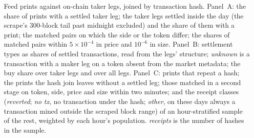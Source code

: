 \begin{table}[htbp]
\caption{Feed prints against on-chain taker legs, joined by transaction hash. Panel~A: the share of prints with a settled taker leg; the taker legs settled inside the day (the scrape's 300-block tail past midnight excluded) and the share of them with a print; the matched pairs on which the side or the token differ; the shares of matched pairs within $5\times10^{-4}$ in price and $10^{-6}$ in size. Panel~B: settlement types as shares of settled transactions, read from the legs' structure; \emph{unknown} is a transaction with a maker leg on a token absent from the market metadata; the buy share over taker legs and over all legs. Panel~C: prints that repeat a hash; the prints the hash join leaves without a settled leg; those matched in a second stage on token, side, price and size within two minutes; and the receipt classes (\emph{reverted}; \emph{no tx}, no transaction under the hash; \emph{other}, on these days always a transaction mined outside the scraped block range) of an hour-stratified sample of the rest, weighted by each hour's population. \emph{receipts} is the number of hashes in the sample.}
\label{tab:fillmatch}
\end{table}
